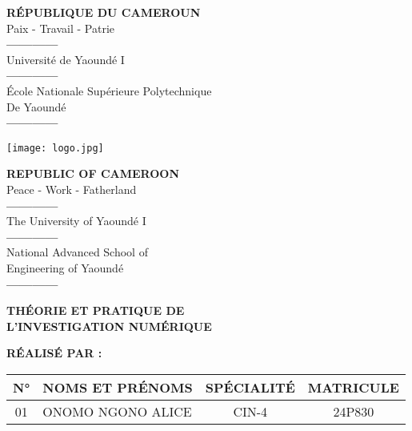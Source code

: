 \documentclass[12pt,a4paper]{article}
\begin{document}
\thispagestyle{empty} %

\begin{center}
  \begin{minipage}{0.35\linewidth}
    \centering
    \textbf{RÉPUBLIQUE DU CAMEROUN} \\ 
    Paix - Travail - Patrie \\[1em]
    \textbf{------------} \\[1em]
    Université de Yaoundé I \\[1em]
    \textbf{------------} \\[1em]
    École Nationale Supérieure Polytechnique \\[1em]
    De Yaoundé \\[1em]
    \textbf{------------} \\
  \end{minipage}
  \hfill
  \begin{minipage}{0.25\linewidth}
    \centering
    \texttt{[image: logo.jpg]}
  \end{minipage}
  \hfill
  \begin{minipage}{0.35\linewidth}
    \centering
    \textbf{REPUBLIC OF CAMEROON} \\ 
    Peace - Work - Fatherland \\[1em]
    \textbf{------------} \\[1em]
    The University of Yaoundé I \\[1em]
    \textbf{------------} \\[1em]
    National Advanced School of \\[1em]
    Engineering of Yaoundé \\[1em]
    \textbf{------------} \\
  \end{minipage}
\end{center}

\vspace{2.5cm}
\begin{center}
  {\Huge \textbf{THÉORIE ET PRATIQUE DE \\[0.5em] L’INVESTIGATION NUMÉRIQUE}}
\end{center}
\vspace{2cm}

\noindent
\textbf{RÉALISÉ PAR :} \\[1em]
\renewcommand{\arraystretch}{1.3}
\begin{tabular}{|c|m{6cm}|c|c|}
  \hline
  \textbf{N°} & \textbf{NOMS ET PRÉNOMS} & \textbf{SPÉCIALITÉ} & \textbf{MATRICULE} \\
  \hline
  01 & ONOMO NGONO ALICE  & CIN-4 & 24P830 \\
  \hline
\end{tabular}
\end{document}
